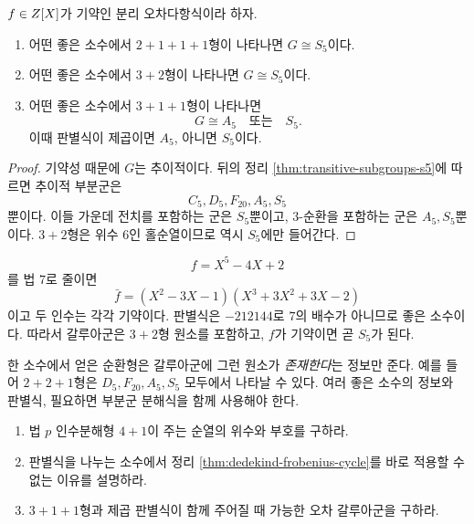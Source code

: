 \begin{corollary}[강한 순환형의 즉시 판정]
$f\in Z[X]$가 기약인 분리 오차다항식이라 하자.
\begin{enumerate}[label=(\roman*)]
  \item 어떤 좋은 소수에서 $2+1+1+1$형이 나타나면 $G\cong S_5$이다.
  \item 어떤 좋은 소수에서 $3+2$형이 나타나면 $G\cong S_5$이다.
  \item 어떤 좋은 소수에서 $3+1+1$형이 나타나면
  \[
    G\cong A_5\quad\text{또는}\quad S_5.
  \]
  이때 판별식이 제곱이면 $A_5$, 아니면 $S_5$이다.
\end{enumerate}
\end{corollary}

\begin{proof}
기약성 때문에 $G$는 추이적이다. 뒤의 정리 \ref{thm:transitive-subgroups-s5}에 따르면 추이적 부분군은
\[
  C_5,D_5,F_{20},A_5,S_5
\]
뿐이다. 이들 가운데 전치를 포함하는 군은 $S_5$뿐이고, $3$-순환을 포함하는 군은 $A_5,S_5$뿐이다. $3+2$형은 위수 $6$인 홀순열이므로 역시 $S_5$에만 들어간다.
\end{proof}

\begin{example}
\[
  f=X^5-4X+2
\]
를 법 $7$로 줄이면
\[
  \bar f
  =(X^2-3X-1)(X^3+3X^2+3X-2)
\]
이고 두 인수는 각각 기약이다. 판별식은 $-212144$로 $7$의 배수가 아니므로 좋은 소수이다. 따라서 갈루아군은 $3+2$형 원소를 포함하고, $f$가 기약이면 곧 $S_5$가 된다.
\end{example}

\begin{pitfall}
한 소수에서 얻은 순환형은 갈루아군에 그런 원소가 \emph{존재한다}는 정보만 준다. 예를 들어 $2+2+1$형은 $D_5,F_{20},A_5,S_5$ 모두에서 나타날 수 있다. 여러 좋은 소수의 정보와 판별식, 필요하면 부분군 분해식을 함께 사용해야 한다.
\end{pitfall}

\begin{checkpoint}
\begin{enumerate}[label=(\alph*)]
  \item 법 $p$ 인수분해형 $4+1$이 주는 순열의 위수와 부호를 구하라.
  \item 판별식을 나누는 소수에서 정리 \ref{thm:dedekind-frobenius-cycle}를 바로 적용할 수 없는 이유를 설명하라.
  \item $3+1+1$형과 제곱 판별식이 함께 주어질 때 가능한 오차 갈루아군을 구하라.
\end{enumerate}
\end{checkpoint}
